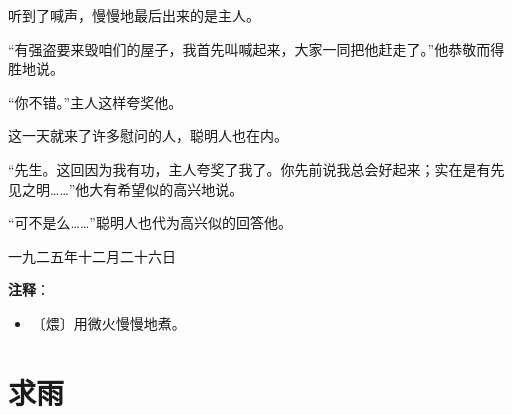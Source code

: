 \documentclass[12pt,UTF-8,openany]{ctexbook}
\begin{document}
\begin{large}
    听到了喊声，慢慢地最后出来的是主人。
    
    “有强盗要来毁咱们的屋子，我首先叫喊起来，大家一同把他赶走了。”他恭敬而得胜地说。
    
    “你不错。”主人这样夸奖他。
    
    这一天就来了许多慰问的人，聪明人也在内。
    
    “先生。这回因为我有功，主人夸奖了我了。你先前说我总会好起来；实在是有先见之明……”他大有希望似的高兴地说。
    
    “可不是么……”聪明人也代为高兴似的回答他。
    
    \hfill 一九二五年十二月二十六日
    
\end{large}


\newpage

\textbf{注释}：

\vspace{-1em}

\begin{itemize}
    \setlength\itemsep{-0.2em}
    \item 〔煨〕用微火慢慢地煮。
\end{itemize}

\chapter{求雨}
\end{document}
